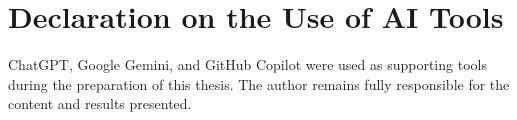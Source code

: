 \chapter*{Declaration on the Use of AI Tools}

ChatGPT, Google Gemini, and GitHub Copilot were used as supporting tools during the preparation of this thesis. The author remains fully responsible for the content and results presented.
